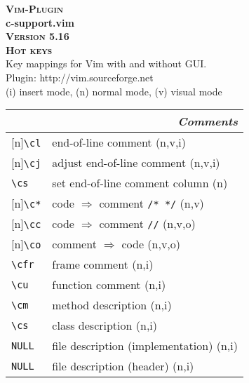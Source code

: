 \documentclass[oneside,11pt,landscape,DIV16]{scrartcl}
\newcommand{\Pluginversion}{5.16}
\newcommand{\Rep}{{\tiny{[n]}}}
\begin{document}
%

\begin{multicols}{3}
%
\begin{center}
\textbf{\textsc{\small{Vim-Plugin}}}\\
\textbf{\LARGE{c-support.vim}}\\
\textbf{\textsc{\small{Version \Pluginversion}}}\\
\textbf{\textsc{\Huge{Hot keys}}}\\ 
Key mappings for Vim with and without GUI.\\
Plugin: http://vim.sourceforge.net\\
\vspace{3.0mm}
{\normalsize (i)} insert mode, {\normalsize (n)} normal mode, {\normalsize (v)} visual mode\\
\vspace{5.0mm}
%
\begin{tabular}[]{|p{10mm}|p{60mm}|}
%
\hline
\multicolumn{2}{|r|}{\textsl{\textbf{C}omments}} \\
\hline \Rep\verb'\cl'  & end-of-line comment                     \hfill (n,v,i)\\
\hline \Rep\verb'\cj'  & adjust end-of-line comment              \hfill (n,v,i)\\
\hline     \verb'\cs'  & set end-of-line comment column          \hfill (n)    \\
\hline \Rep\verb'\c*'  & code $\Rightarrow$ comment \verb'/* */' \hfill (n,v)  \\
\hline \Rep\verb'\cc'  & code $\Rightarrow$ comment \verb'//'    \hfill (n,v,o)\\
\hline \Rep\verb'\co'  & comment $\Rightarrow$ code              \hfill (n,v,o)\\

\hline \verb'\cfr' & frame comment                           \hfill (n,i)\\
\hline \verb'\cu' & function comment                        \hfill (n,i)\\
\hline \verb'\cm' & method description                      \hfill (n,i)\\
\hline \verb'\cs' & class description                       \hfill (n,i)\\
\hline \verb'NULL'& file description (implementation)       \hfill (n,i)\\
\hline \verb'NULL'& file description (header)               \hfill (n,i)\\


\end{tabular}
\end{center}
\end{multicols}
\end{document}
